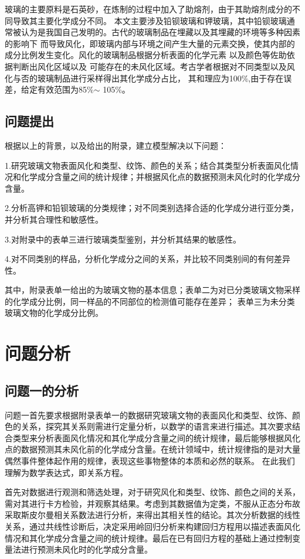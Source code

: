 \documentclass[UTF8]{ctexart}
\begin{document}
玻璃的主要原料是石英砂，在炼制的过程中加入了助熔剂，由于其助熔剂成分的不同导致其主要化学成分不同。
本文主要涉及铅钡玻璃和钾玻璃，其中铅钡玻璃通常被认为是我国自己发明的。古代的玻璃制品在埋藏以及其埋藏的环境等多种因素的影响下
而导致风化，即玻璃内部与环境之间产生大量的元素交换，使其内部的成分比例发生变化。风化的玻璃制品根据分析表面的化学元素
以及颜色等佐助依据判断出风化区域以及
可能存在的未风化区域。考古学者根据对不同类型以及风化与否的玻璃制品进行采样得出其化学成分占比，
其和理应为100$\%$,由于存在误差，给定有效范围为85$\%$$ \sim $ 105$\%$。


\subsection{问题提出}
根据以上的背景，以及给出的附录，建立模型解决以下问题：

1.研究玻璃文物表面风化和类型、纹饰、颜色的关系；结合其类型分析表面风化情况和化学成分含量之间的统计规律；并根据风化点的数据预测未风化时的化学成分含量。

2.分析高钾和铅钡玻璃的分类规律；对不同类别选择合适的化学成分进行亚分类，并分析其合理性和敏感性。

3.对附录中的表单三进行玻璃类型鉴别，并分析其结果的敏感性。

4.对不同类别的样品，分析化学成分之间的关系，并比较不同类别间的有何差异性。


其中，附录表单一给出的为玻璃文物的基本信息；表单二为对已分类玻璃文物采样的化学成分比例，同一样品的不同部位的检测值可能存在差异；
表单三为未分类玻璃文物的化学成分比例。



\section{问题分析}
\subsection{问题一的分析}
问题一首先要求根据附录表单一的数据研究玻璃文物的表面风化和类型、纹饰、颜色的关系，探究其关系则需进行定量分析，以数学的语言来进行描述。其次要求结合类型来分析表面风化情况和其化学成分含量之间的统计规律，最后能够根据风化点的数据预测其未风化前的化学成分含量。在统计领域中，统计规律指的是对大量偶然事件整体起作用的规律，表现这些事物整体的本质和必然的联系。
在此我们理解为数学表达式，即关系方程。

首先对数据进行观测和筛选处理，对于研究风化和类型、纹饰、颜色之间的关系，需对其进行卡方检验，并观察其结果。考虑到其数据值为定类，不服从正态分布故采取斯皮尔曼相关系数法进行分析，来得出其相关性的结论。其次分析数据的线性关系，通过共线性诊断后，决定采用岭回归分析来构建回归方程用以描述表面风化情况和其化学成分含量之间的统计规律。最后在已有回归方程的基础上通过控制变量法进行预测未风化时的化学成分含量。
\end{document}
